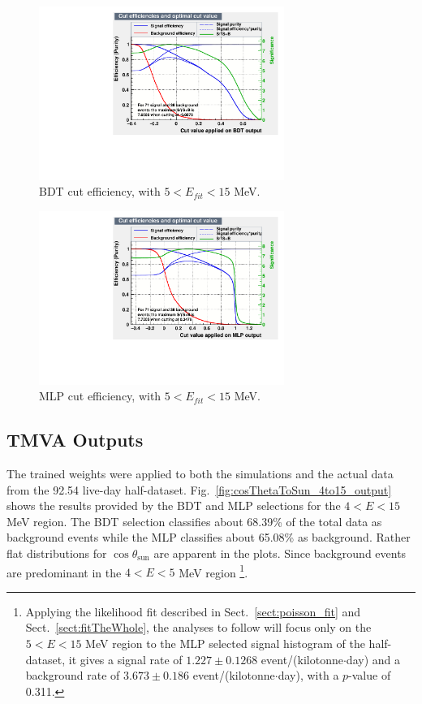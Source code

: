 \begin{figure}[!htb]
	\centering
	\includegraphics[width=8cm]{cutEfficiencyBDT.pdf}
	\caption[BDT cut efficiency, with $5<E_{fit}<15$ MeV.]{BDT cut efficiency, with $5<E_{fit}<15$ MeV.\label{fig:TMVAcutEffiencyBDT}}
\end{figure}

\begin{figure}[!htb]
	\centering
	\includegraphics[width=8cm]{cutEfficiencyMLP.pdf}
	\caption[MLP cut efficiency, with $5<E_{fit}<15$ MeV.]{MLP cut efficiency, with $5<E_{fit}<15$ MeV. \label{fig:TMVAcutEffiencyMLP}}
\end{figure}

\subsection{TMVA Outputs}\label{sect:tmvaOutput}

The trained weights were applied to both the simulations and the actual data from the 92.54 live-day half-dataset.  Fig.~\ref{fig:cosThetaToSun_4to15_output} shows the results provided by the BDT and MLP selections for the $4<E<15$ MeV region. The BDT selection classifies about 68.39\% of the total data as background events while the MLP classifies about 65.08\% as background. Rather flat distributions for $\cos\theta_\mathrm{sun}$ are apparent in the plots. Since background events are predominant in the $4<E<5$ MeV region \footnote{Applying the likelihood fit described in Sect.~\ref{sect:poisson_fit} and Sect.~\ref{sect:fitTheWhole}, the analyses to follow will focus only on the $5<E<15$ MeV region to the MLP selected signal histogram of the half-dataset, it gives a signal rate of $1.227\pm0.1268$ event/(kilotonne$\cdot$day) and a background rate of $3.673\pm0.186$ event/(kilotonne$\cdot$day), with a $p$-value of 0.311.}.

